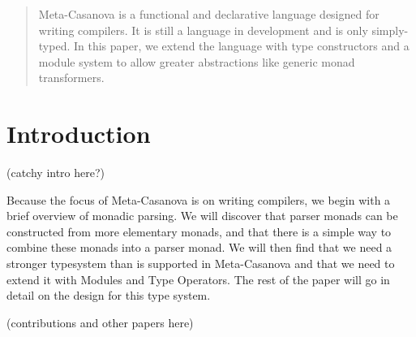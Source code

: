 \begin{abstract}
Meta-Casanova is a functional and declarative language designed for writing compilers. 
It is still a language in development and is only simply-typed.
In this paper, we extend the language with type constructors and a module system to allow greater abstractions like generic monad transformers.
\end{abstract}

\tableofcontents
\pagebreak 

\section{Introduction}
(catchy intro here?)

Because the focus of Meta-Casanova is on writing compilers,
we begin with a brief overview of monadic parsing.
We will discover that parser monads can be constructed from more elementary monads,
and that there is a simple way to combine these monads into a parser monad.
We will then find that we need a stronger typesystem than is supported in Meta-Casanova
and that we need to extend it with Modules and Type Operators.
The rest of the paper will go in detail on the design for this type system.

(contributions and other papers here)

